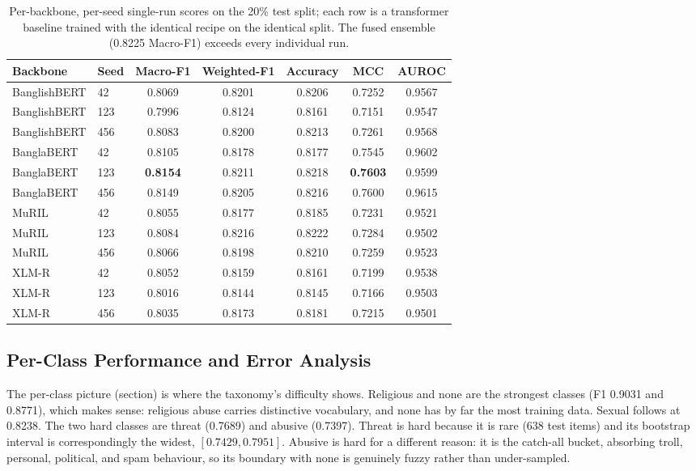 \documentclass[11pt,a4paper]{article}
\def\cref#1{section}%
\def\emph#1{#1}%
\begin{document}
\begin{table}[!htbp]
\centering
\caption{Per-backbone, per-seed single-run scores on the 20\% test split; each row is a transformer baseline trained with the identical recipe on the identical split. The fused ensemble (0.8225 Macro-F1) exceeds every individual run.}
\label{tab:perrun}
\small
\begin{tabular}{@{}llccccc@{}}
\toprule
\textbf{Backbone} & \textbf{Seed} & \textbf{Macro-F1} & \textbf{Weighted-F1} & \textbf{Accuracy} & \textbf{MCC} & \textbf{AUROC} \\
\midrule
BanglishBERT & 42 & 0.8069 & 0.8201 & 0.8206 & 0.7252 & 0.9567 \\
BanglishBERT & 123 & 0.7996 & 0.8124 & 0.8161 & 0.7151 & 0.9547 \\
BanglishBERT & 456 & 0.8083 & 0.8200 & 0.8213 & 0.7261 & 0.9568 \\
BanglaBERT & 42 & 0.8105 & 0.8178 & 0.8177 & 0.7545 & 0.9602 \\
BanglaBERT & 123 & \textbf{0.8154} & 0.8211 & 0.8218 & \textbf{0.7603} & 0.9599 \\
BanglaBERT & 456 & 0.8149 & 0.8205 & 0.8216 & 0.7600 & 0.9615 \\
MuRIL & 42 & 0.8055 & 0.8177 & 0.8185 & 0.7231 & 0.9521 \\
MuRIL & 123 & 0.8084 & 0.8216 & 0.8222 & 0.7284 & 0.9502 \\
MuRIL & 456 & 0.8066 & 0.8198 & 0.8210 & 0.7259 & 0.9523 \\
XLM-R & 42 & 0.8052 & 0.8159 & 0.8161 & 0.7199 & 0.9538 \\
XLM-R & 123 & 0.8016 & 0.8144 & 0.8145 & 0.7166 & 0.9503 \\
XLM-R & 456 & 0.8035 & 0.8173 & 0.8181 & 0.7215 & 0.9501 \\
\bottomrule
\end{tabular}
\end{table}

\subsection{Per-Class Performance and Error Analysis}
\label{sec:perclass-results}

The per-class picture (\cref{tab:perclass}) is where the taxonomy's difficulty shows. \emph{Religious} and \emph{none} are the strongest classes (F1 0.9031 and 0.8771), which makes sense: religious abuse carries distinctive vocabulary, and \emph{none} has by far the most training data. \emph{Sexual} follows at 0.8238. The two hard classes are \emph{threat} (0.7689) and \emph{abusive} (0.7397). \emph{Threat} is hard because it is rare (638 test items) and its bootstrap interval is correspondingly the widest, $[0.7429, 0.7951]$. \emph{Abusive} is hard for a different reason: it is the catch-all bucket, absorbing troll, personal, political, and spam behaviour, so its boundary with \emph{none} is genuinely fuzzy rather than under-sampled.
\end{document}
